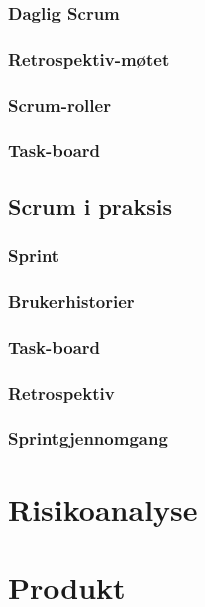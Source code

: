 \documentclass[12pt,a4paper,norsk]{article}
\begin{document}
	\subsubsection{Daglig Scrum}
	\subsubsection{Retrospektiv-møtet}
	\subsubsection{Scrum-roller}
	\subsubsection{Task-board}
	\subsection{Scrum i praksis}
	\subsubsection{Sprint}
	\subsubsection{Brukerhistorier}
	\subsubsection{Task-board}
	\subsubsection{Retrospektiv}
	\subsubsection{Sprintgjennomgang}
	\section{Risikoanalyse}
	\section{Produkt}

\newpage
{}


\end{document}
